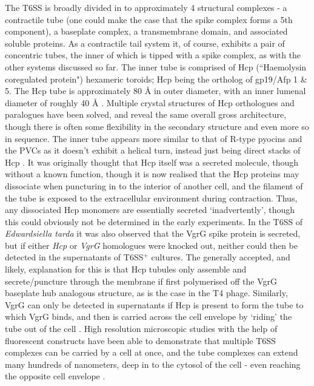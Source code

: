 The T6SS is broadly divided in to approximately 4 structural complexes - a contractile tube (one could make the case that the spike complex forms a 5th component), a baseplate complex, a transmembrane domain, and associated soluble proteins. As a contractile tail system it, of course, exhibits a pair of concentric tubes, the inner of which is tipped with a spike complex, as with the other systems discussed so far. The inner tube is comprised of Hcp (``Haemolysin coregulated protein") hexameric toroids; Hcp being the ortholog of gp19/Afp 1 \& 5. The Hcp tube is approximately 80 \AA{} in outer diameter, with an inner lumenal diameter of roughly 40 \AA{} \citep{Mougous2006a}. Multiple crystal structures of Hcp orthologues and paralogues have been solved, and reveal the same overall gross architecture, though there is often some flexibility in the secondary structure and even more so in sequence. The inner tube appears more similar to that of R-type pyocins and the PVCs as it doesn't exhibit a helical turn, instead just being direct stacks of Hcp \citep{Silverman2012a, Mougous2006a, Osipiuk2011}. It was originally thought that Hcp itself was a secreted molecule, though without a known function, though it is now realised that the Hcp proteins may dissociate when puncturing in to the interior of another cell, and the filament of the tube is exposed to the extracellular environment during contraction. Thus, any dissociated Hcp monomers are essentially secreted `inadvertently', though this could obviously not be determined in the early experiments. In the T6SS of \emph{Edwardsiella tarda} it was also observed that the VgrG spike protein is secreted, but if either \emph{Hcp} or \emph{VgrG} homologues were knocked out, neither could then be detected in the supernatants of T6SS$^+$ cultures. The generally accepted, and likely, explanation for this is that Hcp tubules only assemble and secrete/puncture through the membrane if first polymerised off the VgrG baseplate hub analogous structure, as is the case in the T4 phage. Similarly, VgrG can only be detected in supernatants if Hcp is present to form the tube to which VgrG binds, and then is carried across the cell envelope by `riding' the tube out of the cell \citep{Pukatzki2007, Zheng2007, Hachani2011}. High resolution microscopic studies with the help of fluorescent constructs have been able to demonstrate that multiple T6SS complexes can be carried by a cell at once, and the tube complexes can extend many hundreds of nanometers, deep in to the cytosol of the cell - even reaching the opposite cell envelope \citep{Nguyen2018, Chang2017}.

